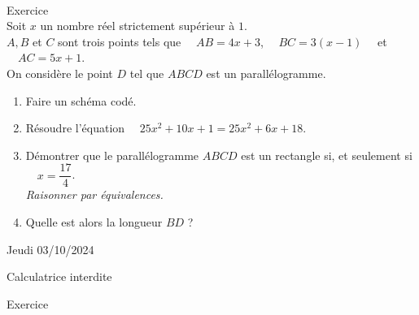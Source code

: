 \documentclass[a4paper,11pt,eval]{nsi}
\newcounter{exoNum}
\newcommand{\exo}[1]
{
	\addtocounter{exoNum}{1}
	{\titlefont\color{UGLiBlue}\Large Exercice\ \theexoNum\ \normalsize{#1}}\smallskip	
}
\begin{document}
\\

\exo{}\\
Soit $x$ un nombre réel strictement supérieur à $1$.\\
$A, B$ et $C$ sont trois points tels que $\quad AB=4x+3$, $\quad BC=3(x-1)\quad$ et $\quad AC=5x+1$.\\
On considère le point $D$ tel que $ABCD$ est un parallélogramme.
\begin{enumerate}
	\item 	Faire un schéma codé.\\
	\vspace*{2.2cm}
	\item   Résoudre l'équation $\quad 25x^2+10x+1=25x^2+6x+18$.\\[.5em]
	\item 	Démontrer que le parallélogramme $ABCD$ est un rectangle si, et seulement si $\quad x=\dfrac{17}{4}$.\\
	\textit{Raisonner par équivalences.}\\[.5em]
	\item	 Quelle est alors la longueur $BD$ ?\\[.5em]
\end{enumerate}

\newpage
\setcounter{exoNum}{0}
\textcolor{UGLiBlue}{Jeudi 03/10/2024}\\
\maketitle
\begin{center}
	Calculatrice interdite
\end{center}

\exo{}\\
{
    \def\xmin{-5}	\def\xmax{7}	\def\ymin{-5}	\def\ymax{7}
}
\end{document}
